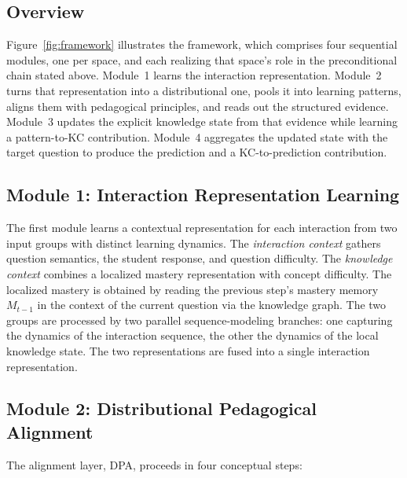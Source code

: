 \documentclass[conference]{IEEEtran}
\begin{document}
\subsection{Overview}

Figure~\ref{fig:framework} illustrates the framework, which comprises four sequential modules, one per space, and each realizing that space's role in the preconditional chain stated above. Module~1 learns the interaction representation. Module~2 turns that representation into a distributional one, pools it into learning patterns, aligns them with pedagogical principles, and reads out the structured evidence. Module~3 updates the explicit knowledge state from that evidence while learning a pattern-to-KC contribution. Module~4 aggregates the updated state with the target question to produce the prediction and a KC-to-prediction contribution.

\subsection{Module 1: Interaction Representation Learning}
\label{sec:irl}

The first module learns a contextual representation for each interaction from two input groups with distinct learning dynamics. The \emph{interaction context} gathers question semantics, the student response, and question difficulty. The \emph{knowledge context} combines a localized mastery representation with concept difficulty. The localized mastery is obtained by reading the previous step's mastery memory $M_{t-1}$ in the context of the current question via the knowledge graph. The two groups are processed by two parallel sequence-modeling branches: one capturing the dynamics of the interaction sequence, the other the dynamics of the local knowledge state. The two representations are fused into a single interaction representation.

\subsection{Module 2: Distributional Pedagogical Alignment}
\label{sec:dpa}

The alignment layer, DPA, proceeds in four conceptual steps:
\end{document}
